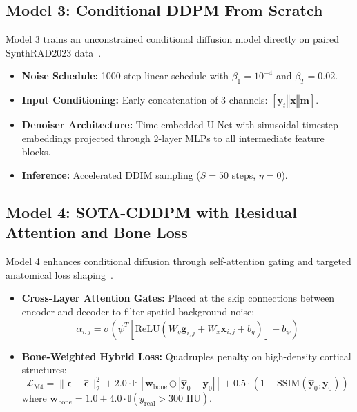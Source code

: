\subsection{Model 3: Conditional DDPM From Scratch}
Model 3 trains an unconstrained conditional diffusion model directly on paired SynthRAD2023 data~\cite{ho2020denoising,saharia2022palette}.
\begin{itemize}
    \item \textbf{Noise Schedule:} 1000-step linear schedule with $\beta_1 = 10^{-4}$ and $\beta_T = 0.02$.
    \item \textbf{Input Conditioning:} Early concatenation of 3 channels: $[\mathbf{y}_t \mathbin{\Vert} \mathbf{x} \mathbin{\Vert} \mathbf{m}]$.
    \item \textbf{Denoiser Architecture:} Time-embedded U-Net with sinusoidal timestep embeddings projected through 2-layer MLPs to all intermediate feature blocks.
    \item \textbf{Inference:} Accelerated DDIM sampling ($S = 50$ steps, $\eta = 0$).
\end{itemize}

\subsection{Model 4: SOTA-CDDPM with Residual Attention and Bone Loss}
Model 4 enhances conditional diffusion through self-attention gating and targeted anatomical loss shaping~\cite{kazerouni2023diffusion}.
\begin{itemize}
    \item \textbf{Cross-Layer Attention Gates:} Placed at the skip connections between encoder and decoder to filter spatial background noise:
    \begin{equation}
    \alpha_{i,j} = \sigma\left( \psi^T \left[ \text{ReLU}(W_g \mathbf{g}_{i,j} + W_x \mathbf{x}_{i,j} + b_g) \right] + b_\psi \right)
    \label{eq:att_gate}
    \end{equation}
    \item \textbf{Bone-Weighted Hybrid Loss:} Quadruples penalty on high-density cortical structures:
    \begin{equation}
    \mathcal{L}_{\text{M4}} = \|\boldsymbol{\epsilon} - \hat{\boldsymbol{\epsilon}}\|_2^2 + 2.0 \cdot \mathbb{E}[\mathbf{w}_{\text{bone}} \odot |\mathbf{\hat{y}}_0 - \mathbf{y}_0|] + 0.5 \cdot (1 - \text{SSIM}(\mathbf{\hat{y}}_0, \mathbf{y}_0))
    \label{eq:m4_bone_loss}
    \end{equation}
    where $\mathbf{w}_{\text{bone}} = 1.0 + 4.0 \cdot \mathbb{I}(y_{\text{real}} > 300\text{ HU})$.
\end{itemize}


